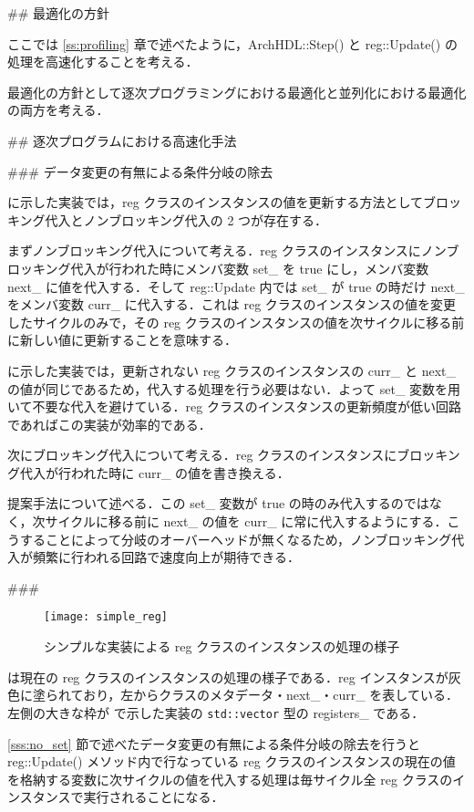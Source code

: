 ## 最適化の方針

ここでは \ref{ss:profiling} 章で述べたように，ArchHDL::Step() と reg::Update() の処理を高速化することを考える．

最適化の方針として逐次プログラミングにおける最適化と並列化における最適化の両方を考える．


## 逐次プログラムにおける高速化手法

### データ変更の有無による条件分岐の除去 \label{sss:no_set}

 に示した実装では，reg クラスのインスタンスの値を更新する方法としてブロッキング代入とノンブロッキング代入の 2 つが存在する．

まずノンブロッキング代入について考える．reg クラスのインスタンスにノンブロッキング代入が行われた時にメンバ変数 set_ を true にし，メンバ変数 next_ に値を代入する．そして reg::Update 内では set_ が true の時だけ next_ をメンバ変数 curr_ に代入する．これは reg クラスのインスタンスの値を変更したサイクルのみで，その reg クラスのインスタンスの値を次サイクルに移る前に新しい値に更新することを意味する．

 に示した実装では，更新されない reg クラスのインスタンスの curr_ と next_ の値が同じであるため，代入する処理を行う必要はない．よって set_ 変数を用いて不要な代入を避けている．reg クラスのインスタンスの更新頻度が低い回路であればこの実装が効率的である．

次にブロッキング代入について考える．reg クラスのインスタンスにブロッキング代入が行われた時に curr_ の値を書き換える．

提案手法について述べる．この set_ 変数が true の時のみ代入するのではなく，次サイクルに移る前に next_ の値を curr_ に常に代入するようにする．こうすることによって分岐のオーバーヘッドが無くなるため，ノンブロッキング代入が頻繁に行われる回路で速度向上が期待できる．


###  \label{sss:mem_copy}

\begin{figure}[t]
 \centering
 \texttt{[image: simple\_reg]}
 \caption{シンプルな実装による reg クラスのインスタンスの処理の様子}
 \label{fig:regs}
\end{figure}

 は現在の reg クラスのインスタンスの処理の様子である．reg インスタンスが灰色に塗られており，左からクラスのメタデータ・next_・curr_ を表している．左側の大きな枠が  で示した実装の \verb`std::vector` 型の registers_ である．

\ref{sss:no_set} 節で述べたデータ変更の有無による条件分岐の除去を行うと reg::Update() メソッド内で行なっている reg クラスのインスタンスの現在の値を格納する変数に次サイクルの値を代入する処理は毎サイクル全 reg クラスのインスタンスで実行されることになる．

